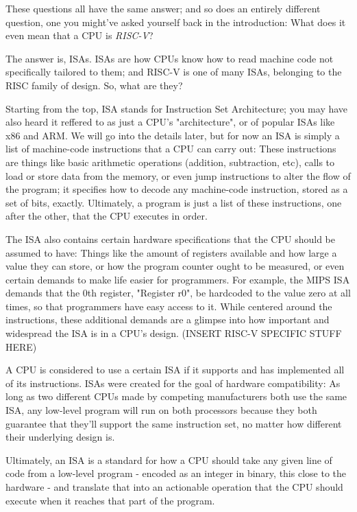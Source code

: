 \documentclass[12pt,twoside]{reedthesis}
\begin{document}
These questions all have the same answer; and so does an entirely different question, one you might've asked yourself back in the introduction: What does it even mean that a CPU is \textit{RISC-V}?

The answer is, ISAs. ISAs are how CPUs know how to read machine code not specifically tailored to them; and RISC-V is one of many ISAs, belonging to the RISC family of design. So, what are they?

Starting from the top, ISA stands for Instruction Set Architecture; you may have also heard it reffered to as just a CPU's "architecture", or of popular ISAs like x86 and ARM. We will go into the details later, but for now an ISA is simply a list of machine-code instructions that a CPU can carry out: These instructions are things like basic arithmetic operations (addition, subtraction, etc), calls to load or store data from the memory, or even jump instructions to alter the flow of the program; it specifies how to decode any machine-code instruction, stored as a set of bits, exactly. Ultimately, a program is just a list of these instructions, one after the other, that the CPU executes in order.

The ISA also contains certain hardware specifications that the CPU should be assumed to have: Things like the amount of registers available and how large a value they can store, or how the program counter ought to be measured, or even certain demands to make life easier for programmers. For example, the MIPS ISA demands that the 0th register, "Register r0", be hardcoded to the value zero at all times, so that programmers have easy access to it. While centered around the instructions, these additional demands are a glimpse into how important and widespread the ISA is in a CPU's design. (INSERT RISC-V SPECIFIC STUFF HERE)

A CPU is considered to use a certain ISA if it supports and has implemented all of its instructions. ISAs were created for the goal of hardware compatibility: As long as two different CPUs made by competing manufacturers both use the same ISA, any low-level program will run on both processors because they both guarantee that they'll support the same instruction set, no matter how different their underlying design is.

Ultimately, an ISA is a standard for how a CPU should take any given line of code from a low-level program - encoded as an integer in binary, this close to the hardware - and translate that into an actionable operation that the CPU should execute when it reaches that part of the program.
\end{document}
